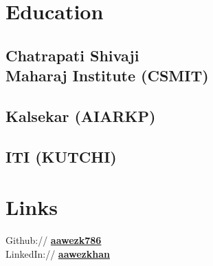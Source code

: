 \documentclass[]{deedy-resume-openfont}
\begin{document}
%
%
\lastupdated

%
%

%
%

\begin{minipage}[t]{0.33\textwidth} 


\section{Education} 
\sectionsep
\subsection{Chatrapati Shivaji \\ 
Maharaj Institute (CSMIT) }
\sectionsep

\sectionsep
\subsection{Kalsekar (AIARKP) }
\sectionsep

\sectionsep
\subsection{ITI (KUTCHI) }
\sectionsep


\section{Links} 
\sectionsep
Github:// \href{https://github.com/aawezk786}{\bf aawezk786} \\
\sectionsep
LinkedIn://  \href{https://www.linkedin.com/in/aawez-khan-90459517b/}{\bf aawezkhan} \\


\end{minipage}
\end{document}
